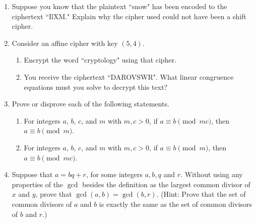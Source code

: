 \documentclass[12pt]{article}
\begin{document}
\begin{enumerate}

\item Suppose you know that the plaintext ``snow" has been encoded to the ciphertext ``IlXM." Explain why the cipher used could not have been a shift cipher.
\item Consider an affine cipher with key $(5,4)$. 
\begin{enumerate}
\item Encrypt the word ``cryptology" using that cipher. 
\item You receive the ciphertext ``DAROVSWR". What linear congruence equations must you solve to decrypt this text?
\end{enumerate}


\item Prove or disprove each of the following statements.
\begin{enumerate}
\item For integers $a$, $b$, $c$, and $m$ with $m,c>0$, if $a\equiv b\pmod{mc}$, then $a\equiv b\pmod{m}$. 
\item For integers $a$, $b$, $c$, and $m$ with $m,c>0$, if $a\equiv b\pmod{m}$, then $a\equiv b\pmod{mc}$. 
\end{enumerate} 
\item Suppose that $a=bq+r$, for some integers $a,b, q$ and $r$. Without using any properties of the $\gcd$ besides the definition as the largest common divisor of $x$ and $y$, prove that $\gcd(a,b)=\gcd(b,r)$.  (Hint: Prove that the set of common divisors of $a$ and $b$ is exactly the same as the set of common divisors of $b$ and $r$.)

\end{enumerate}
\end{document}
